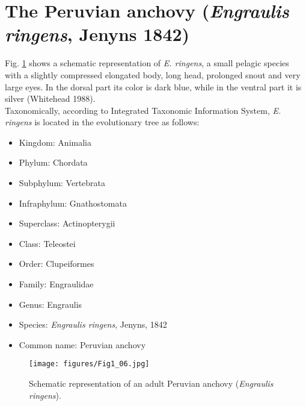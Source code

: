 \section{The Peruvian anchovy (\textit{Engraulis ringens}, Jenyns 1842)}
Fig. \ref{fig:Fig1_06} shows a schematic representation of \textit{E. ringens}, a small pelagic species with a slightly compressed elongated body, long head, prolonged snout and very large eyes. In the dorsal part its color is dark blue, while in the ventral part it is silver \citep{Whit1988} (Whitehead 1988).\\

Taxonomically, according to Integrated Taxonomic Information System, \textit{E. ringens} is located in the evolutionary tree as follows:\\

\begin{itemize}
  \centering
  \item Kingdom: Animalia
  \item Phylum: Chordata
  \item Subphylum: Vertebrata
  \item Infraphylum: Gnathostomata
  \item Superclass: Actinopterygii
  \item Class: Teleostei
  \item Order: Clupeiformes
  \item Family: Engraulidae
  \item Genus: Engraulis
  \item Species: \textit{Engraulis ringens}, Jenyns, 1842
  \item Common name: Peruvian anchovy
\end{itemize}

\begin{figure}[ht]
	\texttt{[image: figures/Fig1\_06.jpg]}
	\centering
	\caption{Schematic representation of an adult Peruvian anchovy (\textit{Engraulis ringens}).}
	\label{fig:Fig1_06}
\end{figure}

